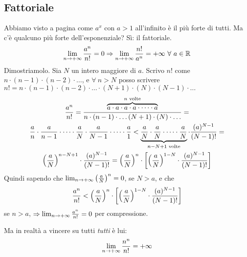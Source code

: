 \documentclass[12pt,a4paper]{article}
\begin{document}
\subsection{Fattoriale}
\label{fattoriale} Abbiamo visto a pagina \pageref{infiniti} come $a^x$ 
con $a > 1$ all'infinito \`e il pi\`u forte di tutti. Ma c'\`e qualcuno 
pi\`u forte dell'esponenziale? S\`i: il fattoriale.
$$
\lim_{n \to +\infty} {a^n \over n!} = 0 \Rightarrow
\lim_{n \to +\infty} {n! \over a^n} = +\infty \ \forall \ a \in \mathbb{R}
$$
Dimostriamolo. Sia $N$ un intero maggiore di $a$. Scrivo $n!$ come 
$ n \cdot (n - 1) \cdot (n - 2) \cdot \dots$, e $\forall \ n > N$ posso
scrivere $ n! = n \cdot (n - 1) \cdot (n - 2) \cdot \dots \cdot (N + 1)
\cdot (N) \cdot (N - 1) \cdot \dots $
\begin{multline*}
{a^n \over n!} = 
{\overbrace{a \cdot a \cdot a \cdot a \cdot \dots \cdot a}^{n \text{ volte}}
 \over 
n \cdot (n - 1) \cdot \dots (N + 1) \cdot (N) \cdot \dots} = \\
{a \over n} \cdot {a \over n -1} \cdot \dots \cdot {a \over N} \cdot {a \over
N - 1} \cdot \dots \cdot {a \over 1} < 
\underbrace{{a \over N} \cdot {a \over N} \cdot \dots \cdot {a \over N}}_{n - N + 1 \text{ volte}} \cdot {(a)^{N - 1} \over (N - 1)!} = \\
\left( a \over N \right)^{n - N + 1} \cdot {(a)^{N - 1} \over (N - 1)!} = 
\left(a \over N \right)^n \cdot \left[ \left( a \over N \right)^{1 - N} \cdot {(a)^{N - 1} \over (N - 1)!} \right]
\end{multline*}
Quindi sapendo che $ \lim_{n \to +\infty} \left( {a \over N} \right)^n = 0 $, 
se $N >a$, e che 
$$ {a^n \over n!} < \left(a \over N \right)^n \cdot \left[ \left( a 
\over N \right)^{1 - N} \cdot {(a)^{N - 1} \over (N - 1)!} \right] $$
se $n > a$, $ \Rightarrow \lim_{n \to +\infty} {a^n \over n!} = 0 $
per compressione.

Ma in realt\`a a vincere su tutti \textit{tutti} \`e lui:
$$
\lim_{n \to +\infty} {n^n \over n!} = +\infty
$$
\end{document}
